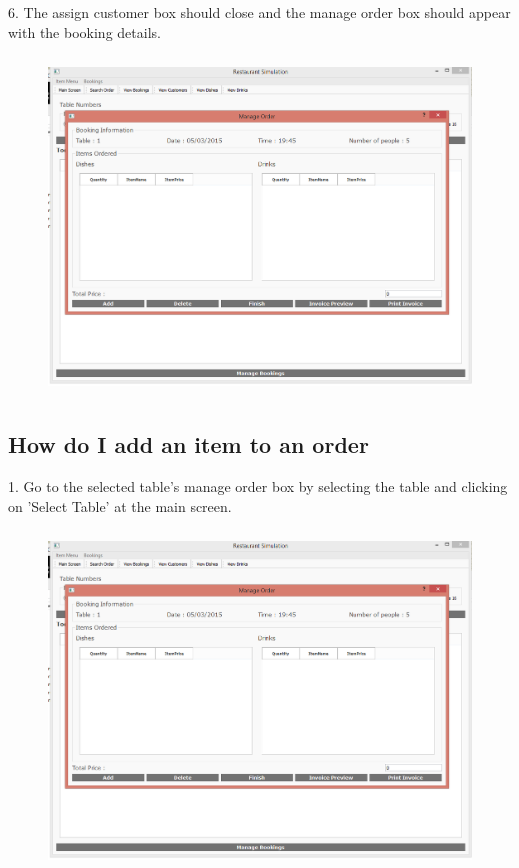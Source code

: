 6. The assign customer box should close and the manage order box should appear with the booking details.

\begin{figure}[H]
    \includegraphics[height = 9cm]{./Manual/images/base/ManageOrder} 
    \caption{} \label{fig:assigncust3}
\end{figure}

\newpage
\subsection{How do I add an item to an order}

1. Go to the selected table's manage order box by selecting the table and clicking on 'Select Table' at the main screen.

\begin{figure}[H]
    \includegraphics[height = 9cm]{./Manual/images/base/ManageOrder} 
    \caption{} \label{fig:additemorder1}
\end{figure}

